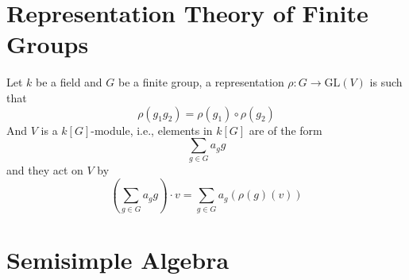 \documentclass[openany]{book}
\begin{document}
\chapter{Representation Theory of Finite Groups}



Let $k$ be a field and $G$ be a finite group, a representation $\rho: G\to\text{GL}(V)$ is such that 
\begin{equation*}
    \rho(g_1g_2)=\rho(g_1)\circ\rho(g_2)
\end{equation*}
And $V$ is a $k[G]$-module, i.e., elements in $k[G]$ are of the form 
\begin{equation*}
    \sum_{g\in G}a_gg
\end{equation*}
and they act on $V$ by 
\begin{equation*}
    \left( \sum_{g\in G}a_gg\right)\cdot v=\sum_{g\in G}a_g\left(\rho(g)(v)\right)
\end{equation*}






\chapter{Semisimple Algebra}


\newpage
\end{document}
